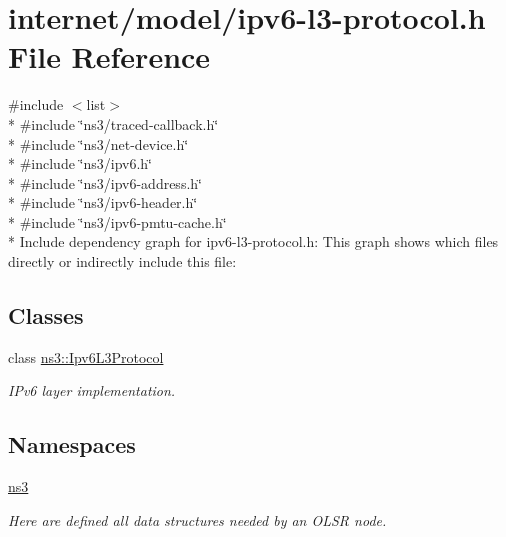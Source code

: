 \hypertarget{ipv6-l3-protocol_8h}{}\section{internet/model/ipv6-\/l3-\/protocol.h File Reference}
\label{ipv6-l3-protocol_8h}
{\ttfamily \#include $<$list$>$}\\*
{\ttfamily \#include \char`\"{}ns3/traced-\/callback.\+h\char`\"{}}\\*
{\ttfamily \#include \char`\"{}ns3/net-\/device.\+h\char`\"{}}\\*
{\ttfamily \#include \char`\"{}ns3/ipv6.\+h\char`\"{}}\\*
{\ttfamily \#include \char`\"{}ns3/ipv6-\/address.\+h\char`\"{}}\\*
{\ttfamily \#include \char`\"{}ns3/ipv6-\/header.\+h\char`\"{}}\\*
{\ttfamily \#include \char`\"{}ns3/ipv6-\/pmtu-\/cache.\+h\char`\"{}}\\*
Include dependency graph for ipv6-\/l3-\/protocol.h\+:
This graph shows which files directly or indirectly include this file\+:
\subsection*{Classes}
\begin{DoxyCompactItemize}
\item 
class \hyperlink{classns3_1_1Ipv6L3Protocol}{ns3\+::\+Ipv6\+L3\+Protocol}
\begin{DoxyCompactList}\small\item\em I\+Pv6 layer implementation. \end{DoxyCompactList}\end{DoxyCompactItemize}
\subsection*{Namespaces}
\begin{DoxyCompactItemize}
\item 
 \hyperlink{namespacens3}{ns3}
\begin{DoxyCompactList}\small\item\em Here are defined all data structures needed by an O\+L\+SR node. \end{DoxyCompactList}\end{DoxyCompactItemize}
